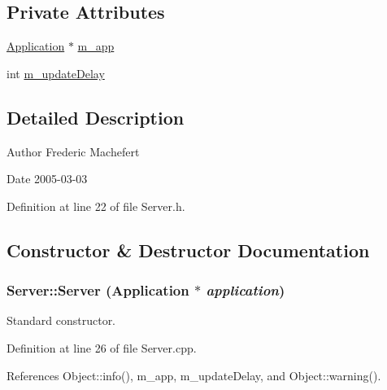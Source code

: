 \subsection*{Private Attributes}
\begin{DoxyCompactItemize}
\item 
\hyperlink{classApplication}{Application} $\ast$ \hyperlink{classServer_ae1c25dc357c4a1145289c747fddaa251}{m\_\-app}
\item 
int \hyperlink{classServer_ae991d55181bff0552a34278ea9f76735}{m\_\-updateDelay}
\end{DoxyCompactItemize}


\subsection{Detailed Description}
\begin{DoxyAuthor}{Author}
Frederic Machefert 
\end{DoxyAuthor}
\begin{DoxyDate}{Date}
2005-\/03-\/03 
\end{DoxyDate}


Definition at line 22 of file Server.h.

\subsection{Constructor \& Destructor Documentation}
\hypertarget{classServer_ac808c867e64a7f139b1958abeb387a15}{
\subsubsection[{Server}]{\setlength{\rightskip}{0pt plus 5cm}Server::Server ({\bf Application} $\ast$ {\em application})}}
\label{classServer_ac808c867e64a7f139b1958abeb387a15}


Standard constructor. 

Definition at line 26 of file Server.cpp.

References Object::info(), m\_\-app, m\_\-updateDelay, and Object::warning().


